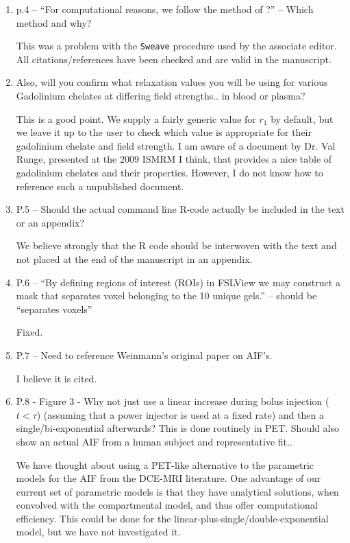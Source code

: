 \documentclass[11pt]{article}
\begin{document}
\begin{enumerate}
\item p.4 – ``For computational reasons, we follow the method of ?'' –
  Which method and why?

  This was a problem with the \texttt{Sweave} procedure used by the
  associate editor.  All citations/references have been checked and
  are valid in the manuscript.

\item Also, will you confirm what relaxation values you will be using
  for various Gadolinium chelates at differing field strengths.. in
  blood or plasma?

  This is a good point.  We supply a fairly generic value for $r_1$ by
  default, but we leave it up to the user to check which value is
  appropriate for their gadolinium chelate and field strength.  I am
  aware of a document by Dr. Val Runge, presented at the 2009 ISMRM I
  think, that provides a nice table of gadolinium chelates and their
  properties.  However, I do not know how to reference such a
  unpublished document.

\item P.5 – Should the actual command line R-code actually be included
  in the text or an appendix?

  We believe strongly that the \textsf{R} code should be interwoven
  with the text and not placed at the end of the manuscript in an
  appendix.

\item P.6 – ``By defining regions of interest (ROIs) in FSLView we may
  construct a mask that separates voxel belonging to the 10 unique
  gels.'' – should be ``separates voxels''

  Fixed.

\item P.7 – Need to reference Weinmann’s original paper on AIF's.

  I believe it is cited.

\item P.8 - Figure 3 - Why not just use a linear increase during bolus
  injection ($t<\tau$) (assuming that a power injector is used at a
  fixed rate) and then a single/bi-exponential afterwards?  This is
  done routinely in PET.  Should also show an actual AIF from a human
  subject and representative fit..

  We have thought about using a PET-like alternative to the parametric
  models for the AIF from the DCE-MRI literature.  One advantage of
  our current set of parametric models is that they have analytical
  solutions, when convolved with the compartmental model, and thus
  offer computational efficiency.  This could be done for the
  linear-plus-single/double-exponential model, but we have not
  investigated it.


\end{enumerate}
\end{document}
